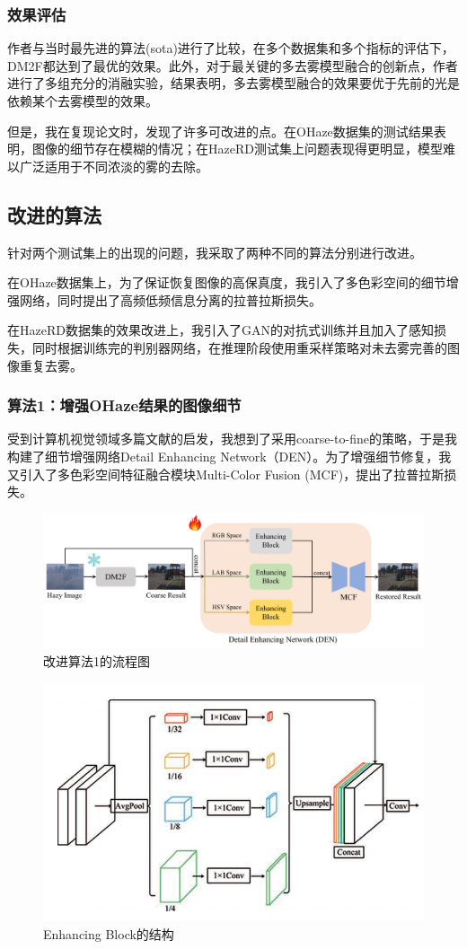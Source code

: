 \documentclass{article}
\begin{document}
\subsubsection{效果评估}
作者与当时最先进的算法(sota)进行了比较，在多个数据集和多个指标的评估下，DM2F都达到了最优的效果。此外，对于最关键的多去雾模型融合的创新点，作者进行了多组充分的消融实验，结果表明，多去雾模型融合的效果要优于先前的光是依赖某个去雾模型的效果。

但是，我在复现论文时，发现了许多可改进的点。在OHaze数据集的测试结果表明，图像的细节存在模糊的情况；在HazeRD测试集上问题表现得更明显，模型难以广泛适用于不同浓淡的雾的去除。

\subsection{改进的算法}
针对两个测试集上的出现的问题，我采取了两种不同的算法分别进行改进。

在OHaze数据集上，为了保证恢复图像的高保真度，我引入了多色彩空间的细节增强网络，同时提出了高频低频信息分离的拉普拉斯损失。

在HazeRD数据集的效果改进上，我引入了GAN的对抗式训练并且加入了感知损失，同时根据训练完的判别器网络，在推理阶段使用重采样策略对未去雾完善的图像重复去雾。

\subsubsection{算法1：增强OHaze结果的图像细节}
受到计算机视觉领域多篇文献的启发，我想到了采用coarse-to-fine的策略，于是我构建了细节增强网络Detail Enhancing Network（DEN）。为了增强细节修复，我又引入了多色彩空间特征融合模块Multi-Color Fusion  (MCF)，提出了拉普拉斯损失。

\begin{figure}[t]
  \centering
  \includegraphics[width=.9\linewidth]{image/pip1.pdf}
  \caption{改进算法1的流程图}
  \label{fig:fig3}
\end{figure}

\begin{figure}[t]
  \centering
  \includegraphics[width=.6\linewidth]{image/EB_pip.png}
  \caption{Enhancing Block的结构}
  \label{fig:fig4}
\end{figure}
\end{document}
